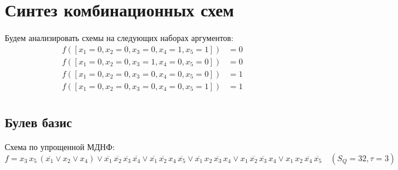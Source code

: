 \documentclass{article}
\begin{document}
\section*{Синтез комбинационных схем}
Будем анализировать схемы на следующих наборах аргументов:
\begin{align*}
    f([x_1 = 0, x_2 = 0, x_3 = 0, x_4 = 1, x_5 = 1]) &= 0 \\
    f([x_1 = 0, x_2 = 0, x_3 = 1, x_4 = 0, x_5 = 0]) &= 0 \\
    f([x_1 = 0, x_2 = 0, x_3 = 0, x_4 = 0, x_5 = 0]) &= 1 \\
    f([x_1 = 0, x_2 = 0, x_3 = 0, x_4 = 0, x_5 = 1]) &= 1 \\
\end{align*}
\newpage
\subsection*{Булев базис}
Схема по упрощенной МДНФ:
\[f = x_{3} \, x_{5} \, \left(\overline{x_{1}} \lor x_{2} \lor x_{4}\right) \lor \overline{x_{1}} \, \overline{x_{2}} \, \overline{x_{3}} \, \overline{x_{4}} \lor \overline{x_{1}} \, \overline{x_{2}} \, x_{4} \, \overline{x_{5}} \lor \overline{x_{1}} \, x_{2} \, \overline{x_{3}} \, x_{4} \lor x_{1} \, \overline{x_{2}} \, \overline{x_{3}} \, x_{4} \lor x_{1} \, x_{2} \, \overline{x_{4}} \, \overline{x_{5}}\quad(S_Q = 32, \tau = 3)\]
\end{document}
